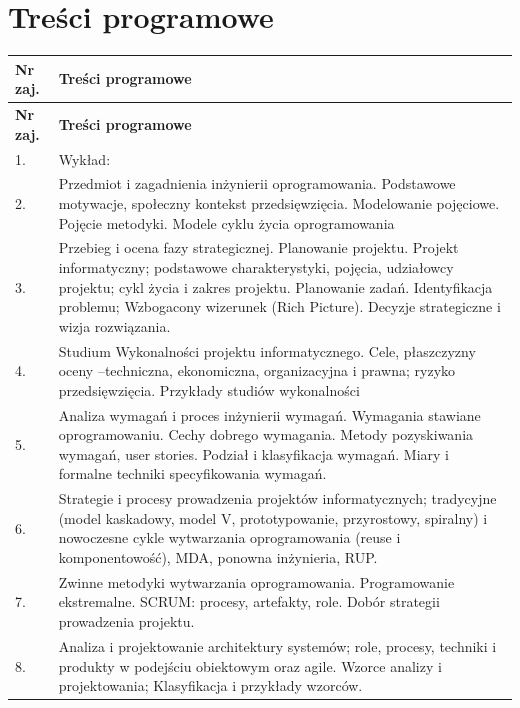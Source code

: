 \documentclass[12pt, a4paper]{article}
\newcommand{\thdrule}{\noalign{\global\setlength{\extrarowheight}{0pt}}}
\newcommand{\thdend}{\noalign{\global\setlength{\extrarowheight}{3pt}}}
\begin{document}
\section{Treści programowe}

{\scriptsize
\begin{longtable}{m{1.5cm}m{14.5cm}}
\thdrule\toprule
\rowcolor{pjatkRed} {\color{white}\textbf{Nr zaj.}} & {\color{white}\textbf{Treści programowe}} \\
\midrule\thdend
\endfirsthead
\thdrule\toprule
\rowcolor{pjatkRed} {\color{white}\textbf{Nr zaj.}} & {\color{white}\textbf{Treści programowe}} \\
\midrule\thdend
\endhead
  \rowcolor{tableRowLight} 1. & Wykład: \\
  \rowcolor{tableRowAlt} 2. & Przedmiot i zagadnienia inżynierii oprogramowania. Podstawowe motywacje, społeczny kontekst przedsięwzięcia. Modelowanie pojęciowe. Pojęcie metodyki. Modele cyklu życia oprogramowania \\
  \rowcolor{tableRowLight} 3. & Przebieg i ocena fazy strategicznej. Planowanie projektu. Projekt informatyczny; podstawowe charakterystyki, pojęcia, udziałowcy projektu; cykl życia i zakres projektu. Planowanie zadań. Identyfikacja problemu; Wzbogacony wizerunek (Rich Picture). Decyzje strategiczne i wizja rozwiązania. \\
  \rowcolor{tableRowAlt} 4. & Studium Wykonalności projektu informatycznego. Cele, płaszczyzny oceny –techniczna, ekonomiczna, organizacyjna i prawna; ryzyko przedsięwzięcia. Przykłady studiów wykonalności \\
  \rowcolor{tableRowLight} 5. & Analiza wymagań i proces inżynierii wymagań. Wymagania stawiane oprogramowaniu. Cechy dobrego wymagania. Metody pozyskiwania wymagań, user stories. Podział i klasyfikacja wymagań. Miary i formalne techniki  specyfikowania wymagań. \\
  \rowcolor{tableRowAlt} 6. & Strategie i procesy prowadzenia projektów informatycznych; tradycyjne (model kaskadowy, model V, prototypowanie, przyrostowy, spiralny) i nowoczesne cykle wytwarzania oprogramowania (reuse i komponentowość), MDA, ponowna inżynieria, RUP. \\
  \rowcolor{tableRowLight} 7. & Zwinne metodyki wytwarzania oprogramowania. Programowanie ekstremalne. SCRUM: procesy, artefakty, role. Dobór strategii prowadzenia projektu. \\
  \rowcolor{tableRowAlt} 8. & Analiza i projektowanie architektury systemów; role, procesy, techniki i produkty w podejściu obiektowym oraz agile. Wzorce analizy i projektowania; Klasyfikacja i przykłady wzorców. \\

\end{longtable}}
\end{document}
